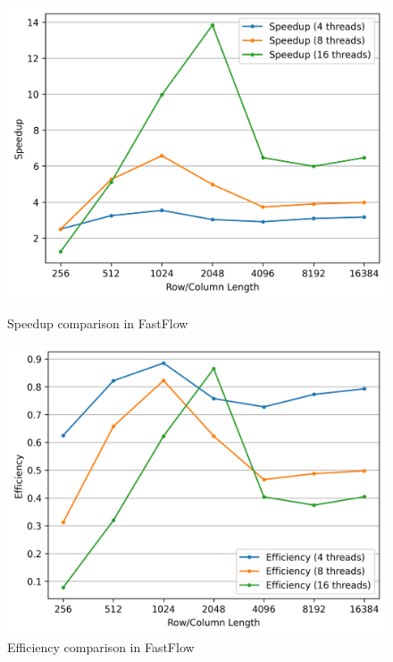 \begin{figure}[h!]
    \begin{minipage}[t]{0.49\textwidth}
        \centering
        \includegraphics[width=\textwidth]{img/FastFlow/ff_speedup.png}
        \caption{Speedup comparison in FastFlow}
        \label{FF_Speedup}
    \end{minipage}
    \hfill
    \begin{minipage}[t]{0.49\textwidth}
        \centering
        \includegraphics[width=\textwidth]{img/FastFlow/ff_efficiency.png}
        \caption{Efficiency comparison in FastFlow}
        \label{FF_Efficiency}


\end{minipage}
\end{figure}
